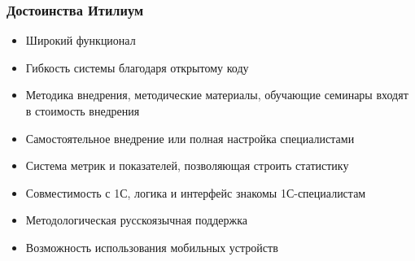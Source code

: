 \documentclass{../industrial-development}
\begin{document}
\begin{frame} \frametitle{Достоинства Итилиум}
	\begin{itemize}
		\item Широкий функционал
		\item Гибкость системы благодаря открытому коду
		\item Методика внедрения, методические материалы, обучающие семинары входят в стоимость внедрения
		\item Самостоятельное внедрение или полная настройка специалистами 
		\item Система метрик и показателей, позволяющая строить статистику
		\item Совместимость с 1С, логика и интерфейс знакомы 1С-специалистам
		\item Методологическая русскоязычная поддержка
		\item Возможность использования мобильных устройств
	\end{itemize}
\end{frame}
\lecturenotes
\end{document}
